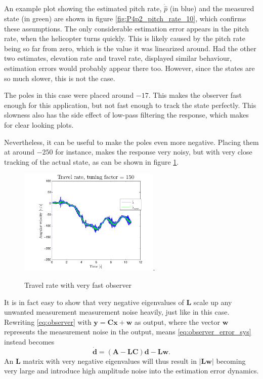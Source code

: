 An example plot showing the estimated pitch rate, $\dot{\hat{p}}$ (in blue) and the measured state (in green) are shown in figure \ref{fig:P4p2_pitch_rate_10}, which confirms these assumptions. The only considerable estimation error appears in the pitch rate, when the helicopter turns quickly. This is likely caused by the pitch rate being so far from zero, which is the value it was linearized around. Had the other two estimates, elevation rate and travel rate, displayed similar behaviour, estimation errors would probably appear there too. However, since the states are so much slower, this is not the case.

The poles in this case were placed around $-17$. This makes the observer fast enough for this application, but not fast enough to track the state perfectly. This slowness also has the side effect of low-pass filtering the response, which makes for clear looking plots. 

Nevertheless, it can be useful to make the poles even more negative. Placing them at around $-250$ for instance, makes the response very noisy, but with very close tracking of the actual state, as can be shown in figure \ref{fig:P4p2_travel_rate_150}.

\begin{figure}[htb]
	\centering
		\includegraphics[width=0.6\textwidth,trim={0cm 0cm 0cm 0cm},clip]{figures/P4p2_travel_rate_tuning_factor_150_OLD.pdf}.
	\caption{Travel rate with very fast observer}
\label{fig:P4p2_travel_rate_150}
\end{figure}
It is in fact easy to show that very negative eigenvalues of $\mathbf{L}$ scale up any unwanted measurement measurement noise heavily, just like in this case. Rewriting \eqref{eq:observer} with $\mathbf{y} = \mathbf{Cx} + \mathbf{w}$ as output, where the vector $\mathbf{w}$ represents the measurement noise in the output, means \eqref{eq:observer_error_sys} instead becomes
\begin{equation}
    \mathbf{\dot{d}} = (\mathbf{A} - \mathbf{LC})\mathbf{d} - \mathbf{Lw}.
\end{equation}
An $\mathbf{L}$ matrix with very negative eigenvalues will thus result in $|\mathbf{Lw}|$ becoming very large and introduce high amplitude noise into the estimation error dynamics. 

